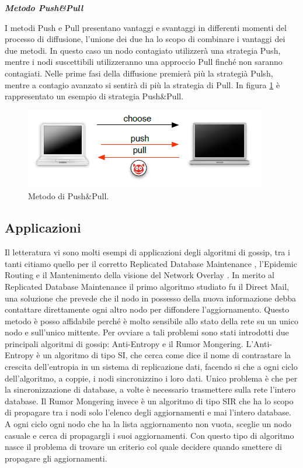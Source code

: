 \noindent\textbf{\textit{Metodo Push\&Pull}}

I metodi Push e Pull presentano vantaggi e svantaggi in differenti momenti del processo di diffusione, l'unione dei due ha lo scopo di combinare i vantaggi dei due metodi. In questo caso un nodo contagiato utilizzerà una strategia Push, mentre i nodi suscettibili utilizzeranno una approccio Pull finché non saranno contagiati. Nelle prime fasi della diffusione premierà più la strategià Pulsh, mentre a contagio avanzato si sentirà di più la strategia di Pull. In figura \ref{fig:push_pull} è rappresentato un esempio di strategia Push\&Pull.
\bigskip
\begin{figure}[h]
	\centering
	\includegraphics[width=0.7\linewidth,keepaspectratio]{Images/algoritmi_gossip/push_pull}
	\caption[Metodo di Push\&Pull]{Metodo di Push\&Pull.}
	\label{fig:push_pull}
\end{figure}
\bigskip

\subsection{Applicazioni}
Il letteratura vi sono molti esempi di applicazioni degli algoritmi di gossip, tra i tanti citiamo quello per il corretto Replicated Database Maintenance \cite{montresor2004-antiEntropy}, l’Epidemic Routing e il Mantenimento della visione del Network Overlay \cite{montresor2004-overlay}. In merito al Replicated Database Maintenance il primo algoritmo studiato fu il Direct Mail, una soluzione che prevede che il nodo in possesso della nuova informazione debba contattare direttamente ogni altro nodo per diffondere l’aggiornamento. Questo metodo è posso affidabile perché è molto sensibile allo stato della rete su un unico nodo e sull’unico mittente. Per ovviare a tali problemi sono stati introdotti due principali algoritmi di gossip: Anti-Entropy e il Rumor Mongering. L’Anti-Entropy è un algoritmo di tipo SI, che cerca come dice il nome di contrastare la crescita dell’entropia in un sistema di replicazione dati, facendo si che a ogni ciclo dell’algoritmo, a coppie, i nodi sincronizzino i loro dati. Unico problema è che per la sincronizzazione di database, a volte è necessario trasmettere sulla rete l’intero database. Il Rumor Mongering invece è un algoritmo di tipo SIR che ha lo scopo di propagare tra i nodi solo l’elenco degli aggiornamenti e mai l’intero database. A ogni ciclo ogni nodo che ha la lista aggiornamento non vuota, sceglie un nodo casuale e cerca di propagargli i suoi aggiornamenti. Con questo tipo di algoritmo nasce il problema di trovare un criterio col quale decidere quando smettere di propagare gli aggiornamenti.
 
